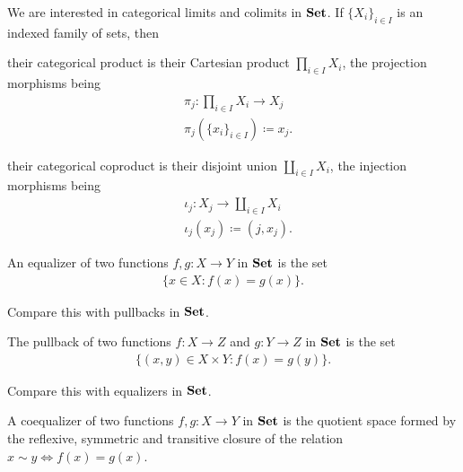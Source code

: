 \begin{theorem}\label{thm:set_categorical_limits}
  We are interested in categorical limits and colimits in \( \operatorname{\mathbf{Set}} \). If \( \{ X_i \}_{i \in I} \) is an indexed family of sets, then
  \begin{defenum}
    \item\label{thm:set_categorical_limits/product} their categorical product is their Cartesian product \( \prod_{i \in I} X_i \), the projection morphisms being
    \begin{align*}
      &\pi_j: \prod_{i \in I} X_i \to X_j \\
      &\pi_j(\{ x_i \}_{i \in I}) \coloneqq x_j.
    \end{align*}

    \item\label{thm:set_categorical_limits/coproduct} their categorical coproduct is their disjoint union \( \coprod_{i \in I} X_i \), the injection morphisms being
    \begin{align*}
      &\iota_j: X_j \to \coprod_{i \in I} X_i \\
      &\iota_j(x_j) \coloneqq (j, x_j).
    \end{align*}

    \item\label{thm:set_categorical_limits/equalizer} An equalizer of two functions \( f, g: X \to Y \) in \( \operatorname{\mathbf{Set}} \) is the set
    \begin{align*}
      \{ x \in X \colon f(x) = g(x) \}.
    \end{align*}

    Compare this with pullbacks in \( \operatorname{\mathbf{Set}} \).

    \item\label{thm:set_categorical_limits/pullback} The pullback of two functions \( f: X \to Z \) and \( g: Y \to Z \) in \( \operatorname{\mathbf{Set}} \) is the set
    \begin{align*}
      \{ (x, y) \in X \times Y \colon f(x) = g(y) \}.
    \end{align*}

    Compare this with equalizers in \( \operatorname{\mathbf{Set}} \).

    \item\label{thm:set_categorical_limits/coequalizer} A coequalizer of two functions \( f, g: X \to Y \) in \( \operatorname{\mathbf{Set}} \) is the quotient space formed by the reflexive, symmetric and transitive closure of the relation \( x \sim y \iff f(x) = g(x) \).


\end{defenum}
\end{theorem}
